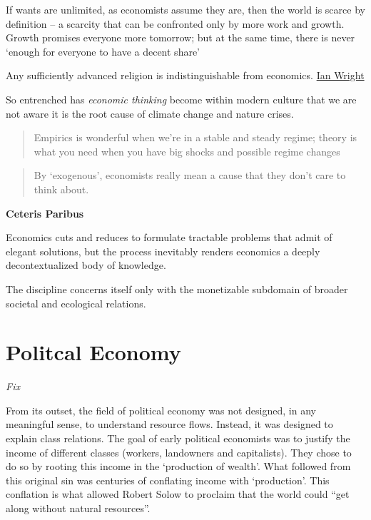 \documentclass[
]{book}
\begin{document}
If wants are unlimited, as economists assume they are, then the world is scarce by definition -- a scarcity that can be confronted only by more work and growth. Growth promises everyone more tomorrow; but at the same time, there is never `enough for everyone to have a decent share'

Any sufficiently advanced religion is indistinguishable from economics.
\href{https://ianwrightsite.wordpress.com/2021/11/25/dark-eucharist-of-the-real-god/}{Ian Wright}

So entrenched has \emph{economic thinking} become within modern culture that we are not aware it is the root cause of climate change and nature crises.

\begin{quote}
Empirics is wonderful when we're in a stable and steady regime; theory is what you need when you have big shocks and possible regime changes
\end{quote}

\begin{quote}
By `exogenous', economists really mean a cause that they don't care to think about.
\end{quote}

\textbf{Ceteris Paribus}

Economics cuts and reduces to formulate tractable problems that admit of elegant solutions, but the process inevitably renders economics a deeply decontextualized body of knowledge.

The discipline concerns itself only with the monetizable subdomain of broader societal and ecological relations.

\hypertarget{politcal-economy}{%
\section{Politcal Economy}\label{politcal-economy}}

\emph{Fix}

From its outset, the field of political economy was not designed, in any meaningful sense, to understand resource flows. Instead, it was designed to explain class relations. The goal of early political economists was to justify the income of different classes (workers, landowners and capitalists). They chose to do so by rooting this income in the `production of wealth'. What followed from this original sin was centuries of conflating income with `production'. This conflation is what allowed Robert Solow to proclaim that the world could ``get along without natural resources''.
\end{document}

